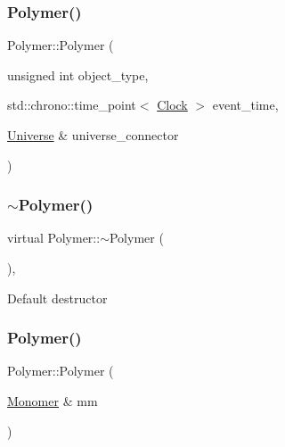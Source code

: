 \mbox{\label{classPolymer_a53797e297c95b3bd934e1b8dd8c0c399}} 
\subsubsection{\texorpdfstring{Polymer()}{Polymer()}\hspace{0.1cm}{\footnotesize\ttfamily [13/14]}}
{\footnotesize\ttfamily Polymer\+::\+Polymer (\begin{DoxyParamCaption}\item[{unsigned int}]{object\+\_\+type,  }\item[{std\+::chrono\+::time\+\_\+point$<$ \mbox{\hyperlink{universe_8h_a0ef8d951d1ca5ab3cfaf7ab4c7a6fd80}{Clock}} $>$}]{event\+\_\+time,  }\item[{\mbox{\hyperlink{classUniverse}{Universe}} \&}]{universe\+\_\+connector }\end{DoxyParamCaption})\hspace{0.3cm}{\ttfamily [inline]}}

\mbox{\label{classPolymer_aac2b3983f375a5691c7d5ca1a79594d5}} 
\subsubsection{\texorpdfstring{$\sim$\+Polymer()}{~Polymer()}\hspace{0.1cm}{\footnotesize\ttfamily [10/11]}}
{\footnotesize\ttfamily virtual Polymer\+::$\sim$\+Polymer (\begin{DoxyParamCaption}{ }\end{DoxyParamCaption})\hspace{0.3cm}{\ttfamily [inline]}, {\ttfamily [virtual]}}

Default destructor \mbox{\label{classPolymer_ae77454a3908652e4df6a26b9cac509a5}} 
\subsubsection{\texorpdfstring{Polymer()}{Polymer()}\hspace{0.1cm}{\footnotesize\ttfamily [14/14]}}
{\footnotesize\ttfamily Polymer\+::\+Polymer (\begin{DoxyParamCaption}\item[{\mbox{\hyperlink{classMonomer}{Monomer}} \&}]{mm }\end{DoxyParamCaption})\hspace{0.3cm}{\ttfamily [inline]}}


